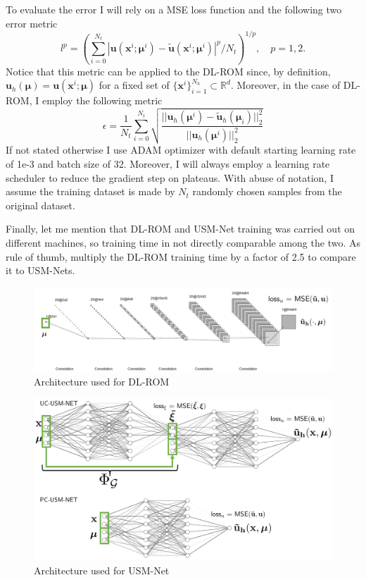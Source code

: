 \documentclass[11pt]{article}
\begin{document}
To evaluate the error I will rely on a MSE loss function and the following two error metric
$$l^p = \left(\sum_{i=0}^{N_t}|\mathbf u(\mathbf x^i; \boldsymbol \mu^i) - \tilde{\mathbf u}(\mathbf x^i; \boldsymbol \mu^i)|^p / N_t\right)^{1/p},\quad p=1,2.$$
Notice that this metric can be applied to the DL-ROM since, by definition, $\mathbf u_h(\boldsymbol \mu)=\mathbf u(\mathbf x^i; \boldsymbol \mu)$ for a fixed set of $\{\mathbf x^i\}_{i=1}^{N_h} \subset \mathbb R^d$.
Moreover, in the case of DL-ROM, I employ the following metric
\begin{equation}
\epsilon = \frac{1}{N_t} \sum_{i=0}^{N_t}\sqrt{\frac{||\mathbf u_h(\boldsymbol \mu^i) - \tilde{\mathbf u}_h(\boldsymbol \mu_i)||_2^2}{||\mathbf u_h(\boldsymbol \mu^i)||_2^2}}
    \label{eq:err_metric}
\end{equation}
If not stated otherwise I use ADAM optimizer with default starting learning rate of 1e-3 and batch size of 32. Moreover, I will always employ a learning rate scheduler to reduce the gradient step on plateaus. With abuse of notation, I assume the training dataset is made by $N_t$ randomly chosen samples from the original dataset. 

Finally, let me mention that DL-ROM and USM-Net training was carried out on different machines, so training time in not directly comparable among the two. As rule of thumb, multiply the DL-ROM training time by a factor of 2.5 to compare it to USM-Nets.

\begin{figure}[t]
    \centering
    \includegraphics[width=\textwidth]{imgs/dl-rom.png}
    \caption{Architecture used for DL-ROM}
    \label{fig:dlrom-architecture}
\end{figure}

\begin{figure}[t]
    \centering
    \includegraphics[width=\textwidth]{imgs/usm-net.png}
    \caption{Architecture used for USM-Net}
    \label{fig:usm-architecture}
\end{figure}
\end{document}
